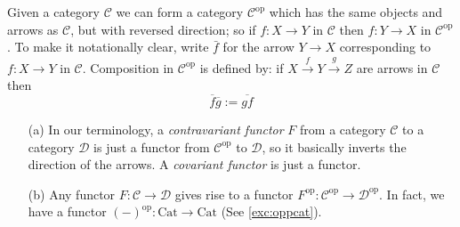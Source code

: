 \documentclass[11pt]{article}
\theoremstyle{plain}
\theoremstyle{definition}
\theoremstyle{remark}
\newcommand{\cC}{\mathcal{C}}
\newcommand{\cD}{\mathcal{D}}
\newcommand{\op}{\mathrm{op}}
\newcommand{\Cat}{\mathrm{Cat}}
\begin{document}
\begin{definition}
    Given a category $\cC$ we can form a category $\cC^{\op}$ which has the
    same objects and arrows as $\cC$, but with reversed direction; so if
    $f:X\rightarrow Y$ in $\cC$ then $f:Y \rightarrow X$ in $\cC^{\op}$. To
    make it notationally clear, write $\bar{f}$ for the arrow $Y \rightarrow
    X$ corresponding to $f: X \rightarrow Y$ in $\cC$. Composition in
    $\cC^{\op}$ is defined by: if $X\xrightarrow{f} Y\xrightarrow{g} Z$ are
    arrows in $\cC$ then
    \begin{equation*}
        \overline{f}\overline{g}:=\overline{gf}
    \end{equation*}
\end{definition}

\begin{note}\label{note:opposite}
\begin{enumerate}

\item[(a)] In our terminology, a {\em contravariant functor} $F$ from a category
$\cC$ to a category $\cD$ is just a functor from $\cC^{\op}$ to $\cD$, so
it basically inverts the direction of the arrows. A {\em covariant 
functor} is just a functor.
    
\item [(b)] Any functor $F: \cC \rightarrow \cD$ gives rise to a functor
$F^{\op}: \cC^{\op} \rightarrow \cD^{\op}.$
In fact, we have a functor $(-)^{\op}: \Cat \rightarrow \Cat$
(See \autoref{exc:oppcat}).
\end{enumerate}
\end{note}
\end{document}
